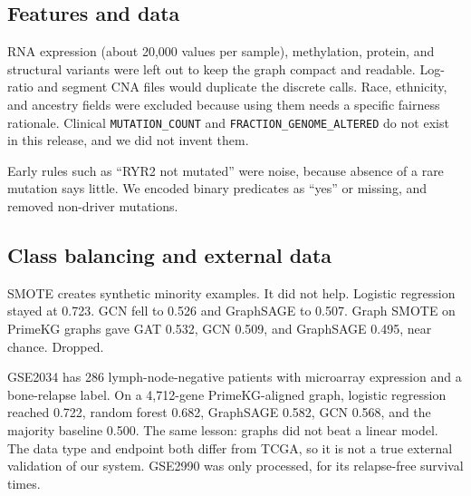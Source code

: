 \documentclass[11pt,a4paper]{article}
\begin{document}
\subsection{Features and data}
\begin{dropbox}
RNA expression (about 20,000 values per sample), methylation, protein, and structural variants were left out to keep the graph compact and readable. Log-ratio and segment CNA files would duplicate the discrete calls. Race, ethnicity, and ancestry fields were excluded because using them needs a specific fairness rationale. Clinical \texttt{MUTATION\_COUNT} and \texttt{FRACTION\_GENOME\_ALTERED} do not exist in this release, and we did not invent them.
\end{dropbox}
\begin{dropbox}
Early rules such as ``RYR2 not mutated'' were noise, because absence of a rare mutation says little. We encoded binary predicates as ``yes'' or missing, and removed non-driver mutations.
\end{dropbox}

\subsection{Class balancing and external data}
\begin{dropbox}
SMOTE creates synthetic minority examples. It did not help. Logistic regression stayed at 0.723. GCN fell to 0.526 and GraphSAGE to 0.507. Graph SMOTE on PrimeKG graphs gave GAT 0.532, GCN 0.509, and GraphSAGE 0.495, near chance. Dropped.
\end{dropbox}
\begin{dropbox}
GSE2034 has 286 lymph-node-negative patients with microarray expression and a bone-relapse label. On a 4,712-gene PrimeKG-aligned graph, logistic regression reached 0.722, random forest 0.682, GraphSAGE 0.582, GCN 0.568, and the majority baseline 0.500. The same lesson: graphs did not beat a linear model. The data type and endpoint both differ from TCGA, so it is not a true external validation of our system. GSE2990 was only processed, for its relapse-free survival times.
\end{dropbox}
\end{document}
